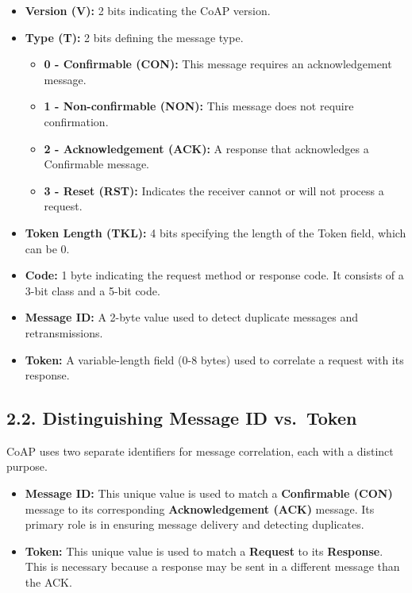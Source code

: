 \documentclass[a4paper, 12pt]{book} %
\begin{document}
\begin{itemize}
\tightlist
\item
  \textbf{Version (V):} 2 bits indicating the CoAP version.
\item
  \textbf{Type (T):} 2 bits defining the message type.

  \begin{itemize}
  \tightlist
  \item
    \textbf{0 - Confirmable (CON):} This message requires an
    acknowledgement message.
  \item
    \textbf{1 - Non-confirmable (NON):} This message does not require
    confirmation.
  \item
    \textbf{2 - Acknowledgement (ACK):} A response that acknowledges a
    Confirmable message.
  \item
    \textbf{3 - Reset (RST):} Indicates the receiver cannot or will not
    process a request.
  \end{itemize}
\item
  \textbf{Token Length (TKL):} 4 bits specifying the length of the Token
  field, which can be 0.
\item
  \textbf{Code:} 1 byte indicating the request method or response code.
  It consists of a 3-bit class and a 5-bit code.
\item
  \textbf{Message ID:} A 2-byte value used to detect duplicate messages
  and retransmissions.
\item
  \textbf{Token:} A variable-length field (0-8 bytes) used to correlate
  a request with its response.
\end{itemize}

\subsection{2.2. Distinguishing Message ID
vs.~Token}\label{distinguishing-message-id-vs.-token}

CoAP uses two separate identifiers for message correlation, each with a
distinct purpose.

\begin{itemize}
\tightlist
\item
  \textbf{Message ID:} This unique value is used to match a
  \textbf{Confirmable (CON)} message to its corresponding
  \textbf{Acknowledgement (ACK)} message. Its primary role is in
  ensuring message delivery and detecting duplicates.
\item
  \textbf{Token:} This unique value is used to match a \textbf{Request}
  to its \textbf{Response}. This is necessary because a response may be
  sent in a different message than the ACK.
\end{itemize}
\end{document}
